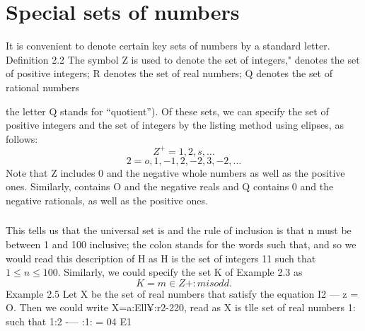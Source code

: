 \section{Special sets of numbers}
\smallskip 
It is convenient to denote certain key sets of numbers by a standard letter.
Deﬁnition 2.2 
The symbol Z is used to denote the set of integers," 
 denotes the set of positive integers; 
 R denotes the set of real numbers;
Q denotes the set of rational numbers {the letter Q stands for “quotient”).
\smallskip 
\smallskip 
Of these sets, we can specify the set of positive integers and the set of integers by the listing method
using elipses, as follows:
\[Z^{+} = {1,2,s,...}\]
\[2 = {o,1,-1,2,-2,3,-2,...}\]
Note that Z includes 0 and the negative whole numbers as well as the positive ones. Similarly,
 contains O and the negative reals and Q contains 0 and the negative rationals, as well as the
positive ones.

\smallskip 
\frametitle{}
This tells us that the universal set is  and the rule of inclusion is that n must be between 1 and
100 inclusive; the colon stands for the words such that, and so we would read this description of
H as
H is the set of integers 11 such that $1 \leq n \leq 100$.
Similarly, we could specify the set K of Example 2.3 as
\[K = {m \in Z+ : m is odd}. \]
\smallskip 
\smallskip 
Example 2.5 Let X be the set of real numbers that satisfy the equation I2 — z = O. Then we
could write
X={a:Ell¥:r2-220},
read as
X is tlle set of real numbers 1: such that 1:2 -— :1: = 04 E1



}
